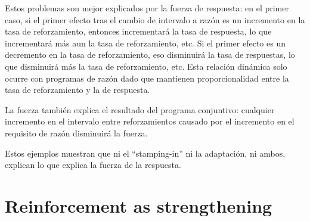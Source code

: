 \documentclass[a4paper,12pt]{article}
\begin{document}
Estos problemas son mejor explicados por la fuerza de respuesta: en el primer caso, si el primer efecto tras el cambio de intervalo a razón es un incremento en la tasa de reforzamiento, entonces incrementará la tasa de respuesta, lo que incrementará más aun la tasa de reforzamiento, etc. Si el primer efecto es un decremento en la tasa de reforzamiento, eso disminuirá la tasa de respuestas, lo que disminuirá más la tasa de reforzamiento, etc.
Esta relación dinámica solo ocurre con programas de razón dado que mantienen proporcionalidad entre la tasa de reforzamiento y la de respuesta.

La fuerza también explica el resultado del programa conjuntivo: cualquier incremento en el intervalo entre reforzamientos causado por el incremento en el requisito de razón disminuirá la fuerza.

Estos ejemplos muestran que ni el ``stamping-in'' ni la adaptación, ni ambos, explican lo que explica la fuerza de la respuesta.

\section{Reinforcement as strengthening}
\end{document}

